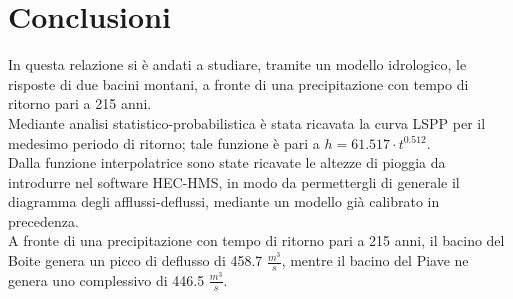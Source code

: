 \section{Conclusioni}
In questa relazione si è andati a studiare, tramite un modello idrologico, le risposte di due bacini montani, a fronte di una precipitazione con tempo di ritorno pari a 215 anni.\\
Mediante analisi statistico-probabilistica è stata ricavata la curva LSPP per il medesimo periodo di ritorno; tale funzione è pari a $h=61.517 \cdot t ^{0.512}$.\\
Dalla funzione interpolatrice sono state ricavate le altezze di pioggia da introdurre nel software HEC-HMS, in modo da permettergli di generale il diagramma degli afflussi-deflussi, mediante un modello già calibrato in precedenza.\\
A fronte di una precipitazione con tempo di ritorno pari a 215 anni, il bacino del Boite genera un picco di deflusso di 458.7 $\frac{m^3}{s}$, mentre il bacino del Piave ne genera uno complessivo di 446.5 $\frac{m^3}{s}$.